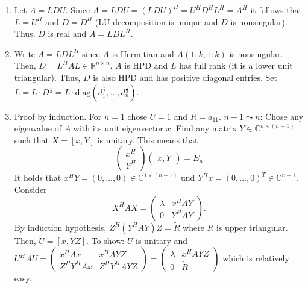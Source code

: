 \documentclass[a4paper, landscape,twocolumn,fontsize=9pt]{scrartcl}
\begin{document}
\begin{enumerate}
    \item Let $A = LDU$. Since $A = LDU = (LDU)^H = U^H D^H L^H = A^H$ it follows that $L = U^H$ and $D = D^H$ (LU decomposition is unique and $D$ is nonsingular). Thus, $D$ is real and $A = LDL^H$.
    \item Write $A = LDL^H$ since $A$ is Hermitian and $A(1:k, 1:k)$ is nonsingular. Then, $D = L^HAL \in \mathbb R^{n \times n}$. $A$ is HPD and $L$ has full rank (it is a lower unit triangular). Thus, $D$ is also HPD and has positive diagonal entries. Set $\tilde L = L \cdot D^{\frac{1}{2}} = L \cdot \mathrm{diag}(d_{1}^{\frac{1}{2}}, ..., d_n^{\frac{1}{2}})$.
    \item Proof by induction. For $n = 1$ chose $U = 1$ and $R = a_{11}$. $n-1 \leadsto n$: Chose any eigenvalue of $A$ with its unit eigenvector $x$. Find any matrix $Y \in \mathbb C^{n \times (n-1)}$ such that $X = [x,Y]$ is unitary. This means that
    \[
    	\begin{pmatrix}
    		x^H \\ Y^H
    	\end{pmatrix} \begin{pmatrix}
    		x, Y
    	\end{pmatrix} = E_n
    \]
    It holds that $x^HY = (0,...,0) \in \mathbb C^{1 \times (n-1)}$ und $Y^Hx = (0,...,0)^T \in \mathbb C^{n-1}$. Consider 
    \[
    	X^HAX = \begin{pmatrix}
    		\lambda & x^HAY \\ 0 & Y^HAY
    	\end{pmatrix}.
    \]
    By induction hypothesis, $Z^H(Y^HAY)Z = \tilde R$ where $R$ is upper triangular. Then, $U = [x, YZ]$. To show: $U$ is unitary and $U^HAU = \begin{pmatrix}
    	x^HAx & x^HAYZ \\ Z^HY^HAx & Z^HY^HAYZ
    \end{pmatrix} = \begin{pmatrix}
    	\lambda & x^HAYZ \\ 0 & \tilde R
    \end{pmatrix}$ which is relatively easy.
    

\end{enumerate}
\end{document}
